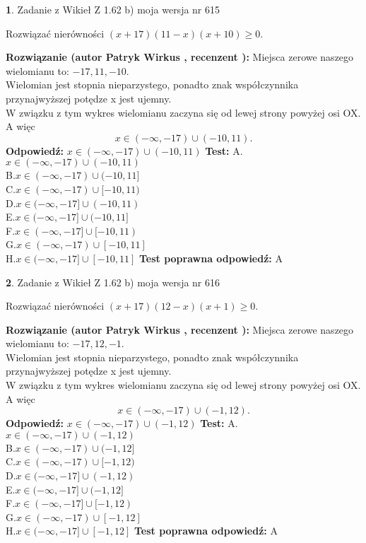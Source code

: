 \documentclass[12pt, a4paper]{article}
\theoremstyle{definition} %
\newtheorem{zad}{}
\newcommand{\zadStart}[1]{\begin{zad}#1\newline}
\newcommand{\zadStop}{\end{zad}}
\newcommand{\rozwStart}[2]{\noindent \textbf{Rozwiązanie (autor #1 , recenzent #2): }\newline}
\newcommand{\rozwStop}{\newline}
\newcommand{\odpStart}{\noindent \textbf{Odpowiedź:}\newline}
\newcommand{\odpStop}{\newline}
\newcommand{\testStart}{\noindent \textbf{Test:}\newline}
\newcommand{\testStop}{\newline}
\newcommand{\kluczStart}{\noindent \textbf{Test poprawna odpowiedź:}\newline}
\newcommand{\kluczStop}{\newline}
\begin{document}
\zadStart{Zadanie z Wikieł Z 1.62 b) moja wersja nr 615}

Rozwiązać nierówności $(x+17)(11-x)(x+10)\ge0$.
\zadStop
\rozwStart{Patryk Wirkus}{}
Miejsca zerowe naszego wielomianu to: $-17, 11, -10$.\\
Wielomian jest stopnia nieparzystego, ponadto znak współczynnika przy\linebreak najwyższej potędze x jest ujemny.\\ W związku z tym wykres wielomianu zaczyna się od lewej strony powyżej osi OX. A więc $$x \in (-\infty,-17) \cup (-10,11).$$
\rozwStop
\odpStart
$x \in (-\infty,-17) \cup (-10,11)$
\odpStop
\testStart
A.$x \in (-\infty,-17) \cup (-10,11)$\\
B.$x \in (-\infty,-17) \cup (-10,11]$\\
C.$x \in (-\infty,-17) \cup [-10,11)$\\
D.$x \in (-\infty,-17] \cup (-10,11)$\\
E.$x \in (-\infty,-17] \cup (-10,11]$\\
F.$x \in (-\infty,-17] \cup [-10,11)$\\
G.$x \in (-\infty,-17) \cup [-10,11]$\\
H.$x \in (-\infty,-17] \cup [-10,11]$
\testStop
\kluczStart
A
\kluczStop



\zadStart{Zadanie z Wikieł Z 1.62 b) moja wersja nr 616}

Rozwiązać nierówności $(x+17)(12-x)(x+1)\ge0$.
\zadStop
\rozwStart{Patryk Wirkus}{}
Miejsca zerowe naszego wielomianu to: $-17, 12, -1$.\\
Wielomian jest stopnia nieparzystego, ponadto znak współczynnika przy\linebreak najwyższej potędze x jest ujemny.\\ W związku z tym wykres wielomianu zaczyna się od lewej strony powyżej osi OX. A więc $$x \in (-\infty,-17) \cup (-1,12).$$
\rozwStop
\odpStart
$x \in (-\infty,-17) \cup (-1,12)$
\odpStop
\testStart
A.$x \in (-\infty,-17) \cup (-1,12)$\\
B.$x \in (-\infty,-17) \cup (-1,12]$\\
C.$x \in (-\infty,-17) \cup [-1,12)$\\
D.$x \in (-\infty,-17] \cup (-1,12)$\\
E.$x \in (-\infty,-17] \cup (-1,12]$\\
F.$x \in (-\infty,-17] \cup [-1,12)$\\
G.$x \in (-\infty,-17) \cup [-1,12]$\\
H.$x \in (-\infty,-17] \cup [-1,12]$
\testStop
\kluczStart
A
\kluczStop
\end{document}
